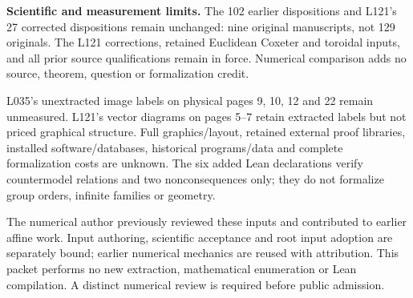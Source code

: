 \documentclass[11pt,a4paper]{article}
\begin{document}
\textbf{Scientific and measurement limits.} The 102 earlier dispositions and L121's 27 corrected dispositions remain unchanged: nine original manuscripts, not 129 originals. The L121 corrections, retained Euclidean Coxeter and toroidal inputs, and all prior source qualifications remain in force. Numerical comparison adds no source, theorem, question or formalization credit.

L035's unextracted image labels on physical pages 9, 10, 12 and 22 remain unmeasured. L121's vector diagrams on pages 5--7 retain extracted labels but not priced graphical structure. Full graphics/layout, retained external proof libraries, installed software/databases, historical programs/data and complete formalization costs are unknown. The six added Lean declarations verify countermodel relations and two nonconsequences only; they do not formalize group orders, infinite families or geometry.

The numerical author previously reviewed these inputs and contributed to earlier affine work. Input authoring, scientific acceptance and root input adoption are separately bound; earlier numerical mechanics are reused with attribution. This packet performs no new extraction, mathematical enumeration or Lean compilation. A distinct numerical review is required before public admission.
\end{document}
